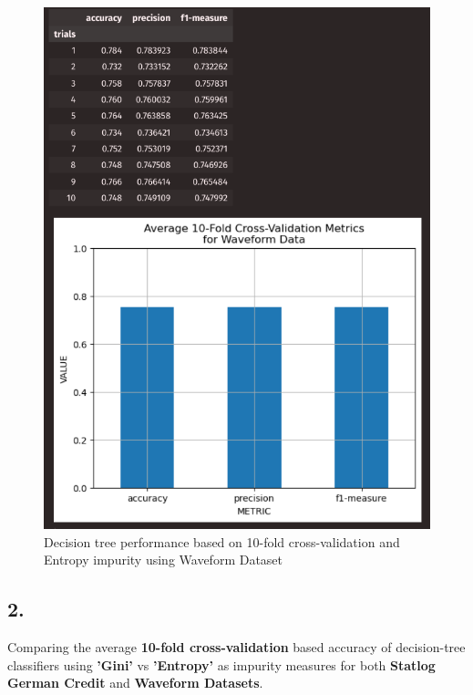\documentclass{article}
\begin{document}
\begin{figure}[H]
\begin{minipage}[t]{0.47\textwidth}
            \includegraphics[width=\textwidth, height=0.35\textheight]{1cw.png}
            \caption{Decision tree performance based on 10-fold cross-validation and Entropy impurity using Waveform Dataset}
        \end{minipage}
    \end{figure}

    \newpage

    \subsection*{2.}

    Comparing the average \textbf{10-fold cross-validation} based accuracy of decision-tree classifiers using \textbf{'Gini'}
    vs \textbf{'Entropy'} as impurity measures for both \textbf{Statlog German Credit} and \textbf{Waveform Datasets}.
\end{document}

